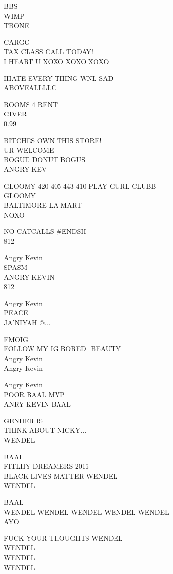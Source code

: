 \documentclass[10pt,letterpaper]{article}
\begin{document}
BBS\\
WIMP\\
TBONE

CARGO\\
TAX CLASS CALL TODAY!\\
I HEART U XOXO XOXO XOXO

IHATE EVERY THING WNL SAD\\
ABOVEALLLLC

ROOMS 4 RENT\\
GIVER\\
0.99

BITCHES OWN THIS STORE!\\
UR WELCOME\\
BOGUD DONUT BOGUS\\
ANGRY KEV

GLOOMY 420 405 443 410 PLAY GURL CLUBB\\
GLOOMY\\
BALTIMORE LA MART\\
NOXO

NO CATCALLS \#ENDSH\\
812

Angry Kevin\\
SPASM\\
ANGRY KEVIN\\
812

Angry Kevin\\
PEACE\\
JA'NIYAH @...

FMOIG\\
FOLLOW MY IG BORED\_BEAUTY\\
Angry Kevin\\
Angry Kevin

Angry Kevin\\
POOR BAAL MVP\\
ANRY KEVIN BAAL

GENDER IS\\
THINK ABOUT NICKY...\\
WENDEL

BAAL\\
FITLHY DREAMERS 2016\\
BLACK LIVES MATTER WENDEL\\
WENDEL

BAAL\\
WENDEL WENDEL WENDEL WENDEL WENDEL\\
AYO

FUCK YOUR THOUGHTS WENDEL\\
WENDEL\\
WENDEL\\
WENDEL
\end{document}
